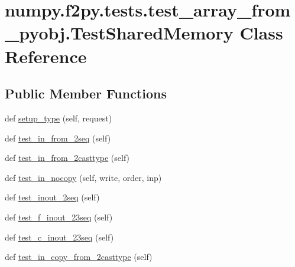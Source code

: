 \hypertarget{classnumpy_1_1f2py_1_1tests_1_1test__array__from__pyobj_1_1TestSharedMemory}{}\section{numpy.\+f2py.\+tests.\+test\+\_\+array\+\_\+from\+\_\+pyobj.\+Test\+Shared\+Memory Class Reference}
\label{classnumpy_1_1f2py_1_1tests_1_1test__array__from__pyobj_1_1TestSharedMemory}
\subsection*{Public Member Functions}
\begin{DoxyCompactItemize}
\item 
def \hyperlink{classnumpy_1_1f2py_1_1tests_1_1test__array__from__pyobj_1_1TestSharedMemory_af736b1657326331ad904be6e714bd5a2}{setup\+\_\+type} (self, request)
\item 
def \hyperlink{classnumpy_1_1f2py_1_1tests_1_1test__array__from__pyobj_1_1TestSharedMemory_a5112b9dd5b2d47c463d13ece01e2e4d3}{test\+\_\+in\+\_\+from\+\_\+2seq} (self)
\item 
def \hyperlink{classnumpy_1_1f2py_1_1tests_1_1test__array__from__pyobj_1_1TestSharedMemory_ad959338ebd07b3137d89e61977ee153a}{test\+\_\+in\+\_\+from\+\_\+2casttype} (self)
\item 
def \hyperlink{classnumpy_1_1f2py_1_1tests_1_1test__array__from__pyobj_1_1TestSharedMemory_acc68b18dbe1f994fcf30999986e08ce3}{test\+\_\+in\+\_\+nocopy} (self, write, order, inp)
\item 
def \hyperlink{classnumpy_1_1f2py_1_1tests_1_1test__array__from__pyobj_1_1TestSharedMemory_a65ec7460da0ee6d0f288d82cdaa600f0}{test\+\_\+inout\+\_\+2seq} (self)
\item 
def \hyperlink{classnumpy_1_1f2py_1_1tests_1_1test__array__from__pyobj_1_1TestSharedMemory_a42dd06a170408d6d84e100133922301f}{test\+\_\+f\+\_\+inout\+\_\+23seq} (self)
\item 
def \hyperlink{classnumpy_1_1f2py_1_1tests_1_1test__array__from__pyobj_1_1TestSharedMemory_ad70e0b5e9708d738c93f928046efa092}{test\+\_\+c\+\_\+inout\+\_\+23seq} (self)
\item 
def \hyperlink{classnumpy_1_1f2py_1_1tests_1_1test__array__from__pyobj_1_1TestSharedMemory_a648656a3c2e10fddd9166975605576fc}{test\+\_\+in\+\_\+copy\+\_\+from\+\_\+2casttype} (self)

\end{DoxyCompactItemize}

